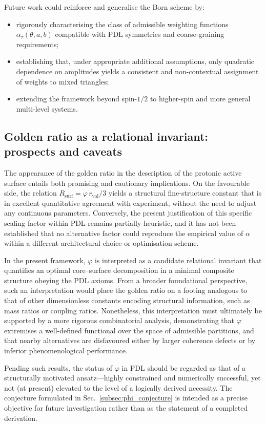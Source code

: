 \documentclass[11pt,a4paper]{article}
\numberwithin{equation}{section}
\begin{document}
Future work could reinforce and generalise the Born scheme by:
\begin{itemize}
  \item rigorously characterising the class of admissible weighting functions $\alpha_\tau(\theta,a,b)$ compatible with PDL symmetries and coarse-graining requirements;
  \item establishing that, under appropriate additional assumptions, only quadratic dependence on amplitudes yields a consistent and non-contextual assignment of weights to mixed triangles;
  \item extending the framework beyond spin-$1/2$ to higher-spin and more general multi-level systems.
\end{itemize}

\subsection{Golden ratio as a relational invariant: prospects and caveats}

The appearance of the golden ratio in the description of the protonic active surface entails both promising and cautionary implications. On the favourable side, the relation $R_{\mathrm{surf}}=\varphi\,r_{\mathrm{val}}/3$ yields a structural fine-structure constant that is in excellent quantitative agreement with experiment, without the need to adjust any continuous parameters. Conversely, the present justification of this specific scaling factor within PDL remains partially heuristic, and it has not been established that no alternative factor could reproduce the empirical value of $\alpha$ within a different architectural choice or optimisation scheme.

In the present framework, $\varphi$ is interpreted as a candidate relational invariant that quantifies an optimal core--surface decomposition in a minimal composite structure obeying the PDL axioms. From a broader foundational perspective, such an interpretation would place the golden ratio on a footing analogous to that of other dimensionless constants encoding structural information, such as mass ratios or coupling ratios. Nonetheless, this interpretation must ultimately be supported by a more rigorous combinatorial analysis, demonstrating that $\varphi$ extremises a well-defined functional over the space of admissible partitions, and that nearby alternatives are disfavoured either by larger coherence defects or by inferior phenomenological performance.

Pending such results, the status of $\varphi$ in PDL should be regarded as that of a structurally motivated ansatz—highly constrained and numerically successful, yet not (at present) elevated to the level of a logically derived necessity. The conjecture formulated in Sec.~\ref{subsec:phi_conjecture} is intended as a precise objective for future investigation rather than as the statement of a completed derivation.
\end{document}
